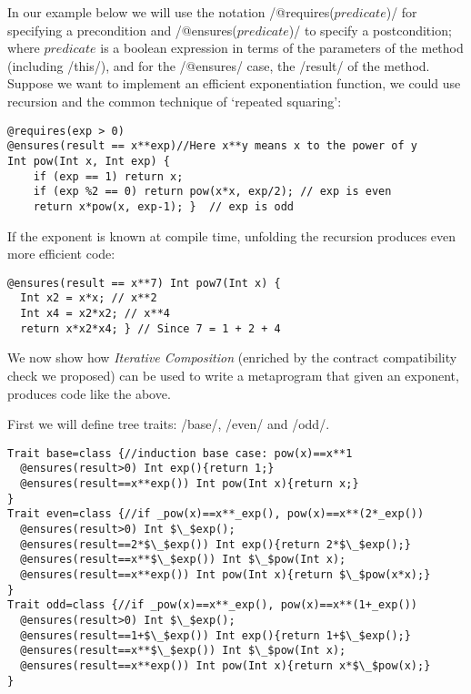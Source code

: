 In our example below we will use the notation /@requires($predicate$)/ 
for specifying a precondition and /@ensures($predicate$)/ 
to specify a postcondition; where $predicate$ is a boolean expression
in terms of the parameters of the method (including /this/), and for the /@ensures/ case, the /result/ of the method.
Suppose we want to implement an efficient exponentiation function, we could use recursion and the common technique of `repeated squaring':
\vspace{-1ex}
\begin{lstlisting}
@requires(exp > 0)
@ensures(result == x**exp)//Here x**y means x to the power of y
Int pow(Int x, Int exp) {
	if (exp == 1) return x;
	if (exp %2 == 0) return pow(x*x, exp/2); // exp is even
	return x*pow(x, exp-1); }  // exp is odd
\end{lstlisting}
If the exponent is known at compile time,
unfolding the recursion produces even more efficient code:
\vspace{-1ex}
\begin{lstlisting}
@ensures(result == x**7) Int pow7(Int x) { 
  Int x2 = x*x; // x**2
  Int x4 = x2*x2; // x**4
  return x*x2*x4; } // Since 7 = 1 + 2 + 4
\end{lstlisting}
\vspace{-1ex}

We now show how \emph{Iterative Composition} %
(enriched by the contract compatibility check we proposed) %
can be used to write a metaprogram that given an exponent, produces code like the above.
 
First we will define tree traits: /base/, /even/ and /odd/.
\begin{lstlisting}
Trait base=class {//induction base case: pow(x)==x**1
  @ensures(result>0) Int exp(){return 1;}  
  @ensures(result==x**exp()) Int pow(Int x){return x;}
}
Trait even=class {//if _pow(x)==x**_exp(), pow(x)==x**(2*_exp())
  @ensures(result>0) Int $\_$exp();
  @ensures(result==2*$\_$exp()) Int exp(){return 2*$\_$exp();}
  @ensures(result==x**$\_$exp()) Int $\_$pow(Int x);
  @ensures(result==x**exp()) Int pow(Int x){return $\_$pow(x*x);}
}
Trait odd=class {//if _pow(x)==x**_exp(), pow(x)==x**(1+_exp())
  @ensures(result>0) Int $\_$exp();
  @ensures(result==1+$\_$exp()) Int exp(){return 1+$\_$exp();}
  @ensures(result==x**$\_$exp()) Int $\_$pow(Int x);
  @ensures(result==x**exp()) Int pow(Int x){return x*$\_$pow(x);}
}
\end{lstlisting}

